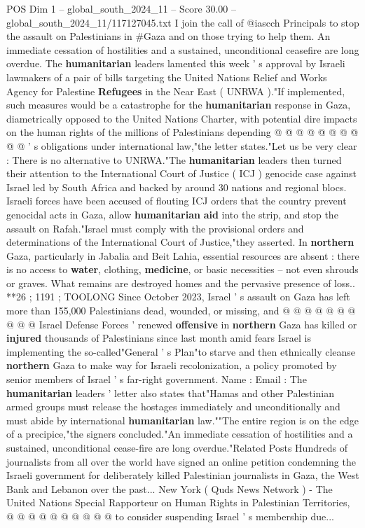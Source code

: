 \begin{textsample}{POS Dim 1 – global\_south\_2024\_11 – Score 30.00 – global\_south\_2024\_11/117127045.txt}
I join the call of @iascch Principals to stop the assault on Palestinians in \#Gaza and on those trying to help them.
An immediate cessation of hostilities and a sustained, unconditional ceasefire are long overdue.
The \textbf{humanitarian} leaders lamented this week ' s approval by Israeli lawmakers of a pair of bills targeting the United Nations Relief and Works Agency for Palestine \textbf{Refugees} in the Near East ( UNRWA )."If implemented, such measures would be a catastrophe for the \textbf{humanitarian} response in Gaza, diametrically opposed to the United Nations Charter, with potential dire impacts on the human rights of the millions of Palestinians depending @ @ @ @ @ @ @ @ @ @ ' s obligations under international law,"the letter states."Let us be very clear : There is no alternative to UNRWA."The \textbf{humanitarian} leaders then turned their attention to the International Court of Justice ( ICJ ) genocide case against Israel led by South Africa and backed by around 30 nations and regional blocs.
Israeli forces have been accused of flouting ICJ orders that the country prevent genocidal acts in Gaza, allow \textbf{humanitarian} \textbf{aid} into the strip, and stop the assault on Rafah."Israel must comply with the provisional orders and determinations of the International Court of Justice,"they asserted.
In \textbf{northern} Gaza, particularly in Jabalia and Beit Lahia, essential resources are absent : there is no access to \textbf{water}, clothing, \textbf{medicine}, or basic necessities -- not even shrouds or graves.
What remains are destroyed homes and the pervasive presence of loss.. **26 ; 1191 ; TOOLONG Since October 2023, Israel ' s assault on Gaza has left more than 155,000 Palestinians dead, wounded, or missing, and @ @ @ @ @ @ @ @ @ @ Israel Defense Forces ' renewed \textbf{offensive} in \textbf{northern} Gaza has killed or \textbf{injured} thousands of Palestinians since last month amid fears Israel is implementing the so-called"General ' s Plan"to starve and then ethnically cleanse \textbf{northern} Gaza to make way for Israeli recolonization, a policy promoted by senior members of Israel ' s far-right government.
Name : Email : The \textbf{humanitarian} leaders ' letter also states that"Hamas and other Palestinian armed groups must release the hostages immediately and unconditionally and must abide by international \textbf{humanitarian} law.""The entire region is on the edge of a precipice,"the signers concluded."An immediate cessation of hostilities and a sustained, unconditional cease-fire are long overdue."Related Posts Hundreds of journalists from all over the world have signed an online petition condemning the Israeli government for deliberately killed Palestinian journalists in Gaza, the West Bank and Lebanon over the past...
New York ( Quds News Network ) - The United Nations Special Rapporteur on Human Rights in Palestinian Territories, @ @ @ @ @ @ @ @ @ @ to consider suspending Israel ' s membership due...


\end{textsample}
